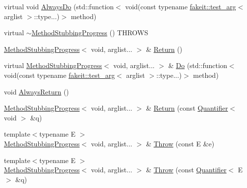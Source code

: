 \begin{DoxyCompactItemize}
\item 
virtual void \mbox{\hyperlink{structfakeit_1_1MethodStubbingProgress_3_01void_00_01arglist_8_8_8_01_4_a3e7ae0c7da9cc0eb29d499b889805eb9}{Always\+Do}} (std\+::function$<$ void(const typename \mbox{\hyperlink{structfakeit_1_1test__arg}{fakeit\+::test\+\_\+arg}}$<$ arglist $>$\+::type...)$>$ method)
\item 
virtual \mbox{\hyperlink{structfakeit_1_1MethodStubbingProgress_3_01void_00_01arglist_8_8_8_01_4_a13f7ed59a8bd8e214f54b4a2946556ac}{$\sim$\+Method\+Stubbing\+Progress}} () T\+H\+R\+O\+WS
\item 
\mbox{\hyperlink{structfakeit_1_1MethodStubbingProgress}{Method\+Stubbing\+Progress}}$<$ void, arglist... $>$ \& \mbox{\hyperlink{structfakeit_1_1MethodStubbingProgress_3_01void_00_01arglist_8_8_8_01_4_ada79edce54db3ffaa88985829f9b5558}{Return}} ()
\item 
virtual \mbox{\hyperlink{structfakeit_1_1MethodStubbingProgress}{Method\+Stubbing\+Progress}}$<$ void, arglist... $>$ \& \mbox{\hyperlink{structfakeit_1_1MethodStubbingProgress_3_01void_00_01arglist_8_8_8_01_4_ae41031c8833fad09c16cbbc89569918b}{Do}} (std\+::function$<$ void(const typename \mbox{\hyperlink{structfakeit_1_1test__arg}{fakeit\+::test\+\_\+arg}}$<$ arglist $>$\+::type...)$>$ method)
\item 
void \mbox{\hyperlink{structfakeit_1_1MethodStubbingProgress_3_01void_00_01arglist_8_8_8_01_4_a750cd97e361c308232871da7c336e53e}{Always\+Return}} ()
\item 
\mbox{\hyperlink{structfakeit_1_1MethodStubbingProgress}{Method\+Stubbing\+Progress}}$<$ void, arglist... $>$ \& \mbox{\hyperlink{structfakeit_1_1MethodStubbingProgress_3_01void_00_01arglist_8_8_8_01_4_afbc0d4429dddcbab63de1c88176ea0f1}{Return}} (const \mbox{\hyperlink{structfakeit_1_1Quantifier}{Quantifier}}$<$ void $>$ \&q)
\item 
{\footnotesize template$<$typename E $>$ }\\\mbox{\hyperlink{structfakeit_1_1MethodStubbingProgress}{Method\+Stubbing\+Progress}}$<$ void, arglist... $>$ \& \mbox{\hyperlink{structfakeit_1_1MethodStubbingProgress_3_01void_00_01arglist_8_8_8_01_4_a8b0d920dc6424eadd7dce7cb9df66814}{Throw}} (const E \&e)
\item 
{\footnotesize template$<$typename E $>$ }\\\mbox{\hyperlink{structfakeit_1_1MethodStubbingProgress}{Method\+Stubbing\+Progress}}$<$ void, arglist... $>$ \& \mbox{\hyperlink{structfakeit_1_1MethodStubbingProgress_3_01void_00_01arglist_8_8_8_01_4_a9eb6f25dd382ef939b775345205f42c1}{Throw}} (const \mbox{\hyperlink{structfakeit_1_1Quantifier}{Quantifier}}$<$ E $>$ \&q)

\end{DoxyCompactItemize}
